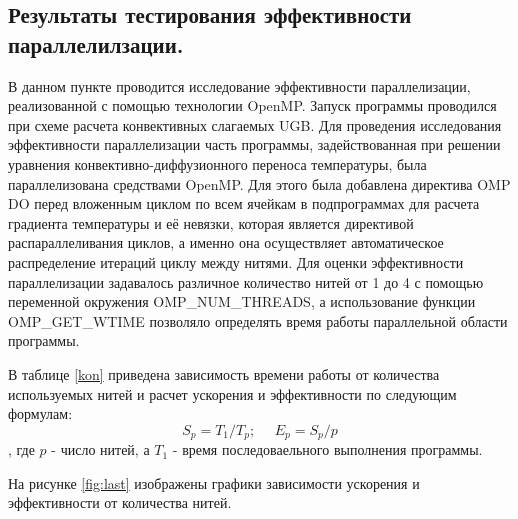 \subsection{Результаты тестирования эффективности параллелилзации.}
В данном пункте проводится исследование эффективности
параллелизации, реализованной с помощью технологии OpenMP. Запуск
программы проводился при схеме расчета конвективных слагаемых UGB. 
Для проведения исследования эффективности параллелизации часть программы,
задействованная при решении уравнения конвективно-диффузионного переноса
температуры, была параллелизована средствами OpenMP. Для этого была добавлена
директива OMP DO перед вложенным циклом по всем ячейкам в подпрограммах для
расчета градиента температуры и её невязки, которая является директивой
распараллеливания циклов, а именно она осуществляет автоматическое распределение
итераций циклу между нитями. Для оценки эффективности параллелизации задавалось
различное количество нитей от 1 до 4 с помощью переменной окружения
OMP\_NUM\_THREADS, а использование функции OMP\_GET\_WTIME позволяло
определять время работы параллельной области программы.


В таблице \ref{kon} приведена зависимость времени работы от количества используемых нитей и расчет ускорения и эффективности по следующим формулам:
$$S_p = T_1/T_p;~~~~~~E_p=S_p/p$$
, где $p$ - число нитей, а $T_1$ - время последоваельного выполнения программы.
\begin{table}[]
    \caption{Зависимость времени, ускорения и эффективности от количества нитей.}
    \centering

    \label{tab:kon}
\end{table}
На рисунке \ref{fig:last} изображены графики зависимости ускорения и эффективности от количества нитей.

